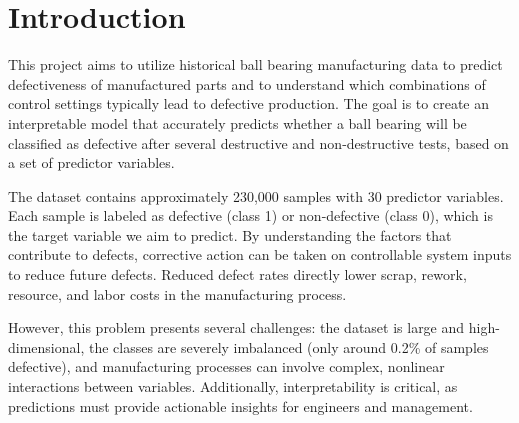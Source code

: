 \documentclass{article}
\begin{document}
\begin{abstract}
Several techniques will be explored to mitigate class imbalance during
model training, including random oversampling, random undersampling,
Synthetic Minority Oversampling Technique (SMOTE), and class-weighted
learning methods. Multiple machine learning models will be evaluated,
including Logistic Regression, Decision Trees, Random Forests, and
boosting methods such as AdaBoost or gradient-boosted trees.

The experimental design includes model benchmarking, ablation studies of
imbalance-handling strategies, and sensitivity analysis across different
data split ratios. In addition, interpretability methods such as feature
importance analysis and SHAP values will be used to identify which
predictors contribute most strongly to defect detection.

The goal of this project is to develop a reliable and interpretable
machine learning framework that improves defect detection while
providing actionable insights for manufacturing quality control.
\end{abstract}


\section{Introduction}

This project aims to utilize historical ball bearing manufacturing data to predict 
defectiveness of manufactured parts and to understand which combinations of control 
settings typically lead to defective production. The goal is to create an interpretable 
model that accurately predicts whether a ball bearing will be classified as defective 
after several destructive and non-destructive tests, based on a set of predictor variables.

The dataset contains approximately 230,000 samples with 30 predictor variables. Each sample 
is labeled as defective (class 1) or non-defective (class 0), which is the target variable 
we aim to predict. By understanding the factors that contribute to defects, corrective 
action can be taken on controllable system inputs to reduce future defects. Reduced defect 
rates directly lower scrap, rework, resource, and labor costs in the manufacturing process.

However, this problem presents several challenges: the dataset is large and high-dimensional, 
the classes are severely imbalanced (only around 0.2\% of samples defective), and manufacturing 
processes can involve complex, nonlinear interactions between variables. Additionally, 
interpretability is critical, as predictions must provide actionable insights for engineers 
and management.
\end{document}
